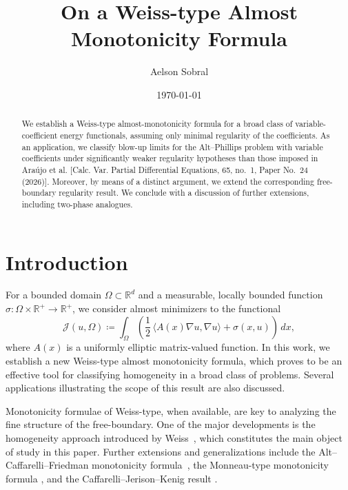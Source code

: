 \documentclass[reqno,11pt]{amsart}
\title[On a Weiss-type Almost Monotonicity Formula]{On a Weiss-type Almost Monotonicity Formula}
\author[A. Sobral]{Aelson Sobral}
\newcommand{\1}{\mathds{1}}  %
\numberwithin{equation}{section}
\begin{document}





\begin{abstract} 
We establish a Weiss-type almost-monotonicity formula for a broad class of variable-coefficient energy functionals, assuming only minimal regularity of the coefficients. As an application, we classify blow-up limits for the Alt--Phillips problem with variable coefficients under significantly weaker regularity hypotheses than those imposed in Ara\'ujo et al. [Calc. Var. Partial Differential Equations, 65, no.~1, Paper No.~24 (2026)]. Moreover, by means of a distinct argument, we extend the corresponding free-boundary regularity result. We conclude with a discussion of further extensions, including two-phase analogues.
\end{abstract}  

\date{\today}

\maketitle


\section{Introduction} \label{sct intro}

For a bounded domain $\Omega \subset \mathbb{R}^d$ and a measurable, locally bounded function $\sigma \colon \Omega \times \mathbb{R}^+ \to \mathbb{R}^+$, we consider almost minimizers to the functional
\begin{equation}\label{main functional}
    \mathcal{J}(u,\Omega) \coloneqq \int_{\Omega} \left( \frac{1}{2} \, \langle A(x)\nabla u, \nabla u \rangle + \sigma(x,u)\right) \, dx,
\end{equation}
where $A(x)$ is a uniformly elliptic matrix-valued function. In this work, we establish a new Weiss-type almost monotonicity formula, which proves to be an effective tool for classifying homogeneity in a broad class of problems. Several applications illustrating the scope of this result are also discussed.

Monotonicity formulae of Weiss-type, when available, are key to analyzing the fine structure of the free-boundary. One of the major developments is the homogeneity approach introduced by Weiss~\cite{W2}, which constitutes the main object of study in this paper. Further extensions and generalizations include the Alt--Caffarelli--Friedman monotonicity formula~\cite{ACF}, the Monneau-type monotonicity formula \cite{MP}, and the Caffarelli--Jerison--Kenig result \cite{CJK}.
\end{document}
